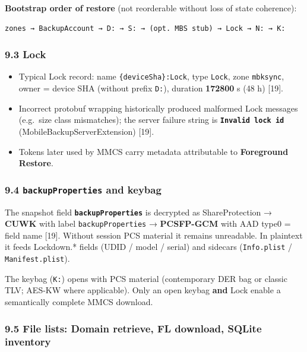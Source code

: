 \documentclass[
  english,
  10pt]{article}
\providecommand{\tightlist}{%
  \setlength{\itemsep}{0pt}\setlength{\parskip}{0pt}}
\begin{document}
\textbf{Bootstrap order of restore} (not reorderable without loss of
state coherence):

\begin{verbatim}
zones → BackupAccount → D: → S: → (opt. MBS stub) → Lock → N: → K:
\end{verbatim}

\subsubsection{9.3 Lock}\label{lock}

\begin{itemize}
\tightlist
\item
  Typical Lock record: name \texttt{\{deviceSha\}:Lock}, type
  \texttt{Lock}, zone \texttt{mbksync}, owner = device SHA (without
  prefix \texttt{D:}), duration \textbf{172800} s (48 h) {[}19{]}.
\item
  Incorrect protobuf wrapping historically produced malformed Lock
  messages (e.g.~size class mismatches); the server failure string is
  \textbf{\texttt{Invalid\ lock\ id}} (MobileBackupServerExtension)
  {[}19{]}.
\item
  Tokens later used by MMCS carry metadata attributable to
  \textbf{Foreground Restore}.
\end{itemize}

\subsubsection{\texorpdfstring{9.4 \texttt{backupProperties} and
keybag}{9.4 backupProperties and keybag}}\label{backupproperties-and-keybag}

The snapshot field \textbf{\texttt{backupProperties}} is decrypted as
ShareProtection → \textbf{CUWK} with label \texttt{backupProperties} →
\textbf{PCSFP-GCM} with AAD type0 = field name {[}19{]}. Without session
PCS material it remains unreadable. In plaintext it feeds Lockdown.*
fields (UDID / model / serial) and sidecars (\texttt{Info.plist} /
\texttt{Manifest.plist}).

The keybag (\texttt{K:}) opens with PCS material (contemporary DER bag
or classic TLV; AES-KW where applicable). Only an open keybag
\textbf{and} Lock enable a semantically complete MMCS download.

\subsubsection{9.5 File lists: Domain retrieve, FL download, SQLite
inventory}\label{file-lists-domain-retrieve-fl-download-sqlite-inventory}
\end{document}

